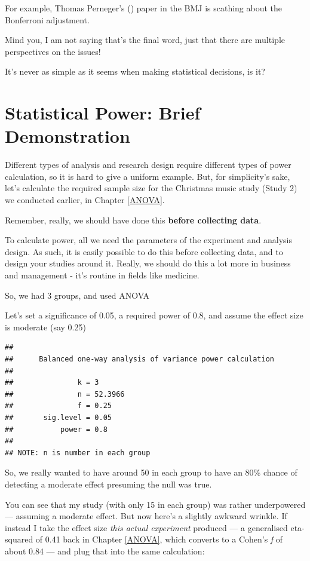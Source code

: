 \documentclass[
]{book}
\begin{document}
For example, Thomas Perneger's () paper in the BMJ is scathing about the Bonferroni adjustment.

Mind you, I am not saying that's the final word, just that there are multiple perspectives on the issues!

It's never as simple as it seems when making statistical decisions, is it?

\section{Statistical Power: Brief Demonstration}\label{statistical-power-brief-demonstration}

Different types of analysis and research design require different types of power calculation, so it is hard to give a uniform example. But, for simplicity's sake, let's calculate the required sample size for the Christmas music study (Study 2) we conducted earlier, in Chapter \ref{ANOVA}.

Remember, really, we should have done this \textbf{before collecting data}.

To calculate power, all we need the parameters of the experiment and analysis design. As such, it is easily possible to do this before collecting data, and to design your studies around it. Really, we should do this a lot more in business and management - it's routine in fields like medicine.

So, we had 3 groups, and used ANOVA

Let's set a significance of 0.05, a required power of 0.8, and assume the effect size is moderate (say 0.25)

\begin{verbatim}
## 
##      Balanced one-way analysis of variance power calculation 
## 
##               k = 3
##               n = 52.3966
##               f = 0.25
##       sig.level = 0.05
##           power = 0.8
## 
## NOTE: n is number in each group
\end{verbatim}

So, we really wanted to have around 50 in each group to have an 80\% chance of detecting a moderate effect presuming the null was true.

You can see that my study (with only 15 in each group) was rather underpowered --- assuming a moderate effect. But now here's a slightly awkward wrinkle. If instead I take the effect size \emph{this actual experiment} produced --- a generalised eta-squared of 0.41 back in Chapter \ref{ANOVA}, which converts to a Cohen's \emph{f} of about 0.84 --- and plug that into the same calculation:
\end{document}
